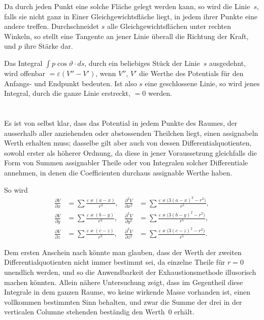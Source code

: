\documentclass[12pt,a4paper]{article}
\begin{document}
Da durch jeden Punkt eine solche Fläche gelegt werden kann, so wird die Linie~$s$,
falls sie nicht ganz in Einer Gleichgewichtsfläche liegt, in jedem ihrer Punkte eine
andere treffen. Durchschneidet $s$ alle Gleichgewichtsflächen unter rechten Winkeln,
so stellt eine Tangente an jener Linie überall die Richtung der Kraft, und $p$
ihre Stärke dar.

Das Integral $\int p\cos\vartheta\cdot ds$, durch ein beliebiges Stück der Linie~$s$ ausgedehnt,
wird offenbar $= \varepsilon(V''-V')$, wenn $V''$, $V'$ die Werthe des Potentials
für den Anfangs- und Endpunkt bedeuten. Ist also $s$ eine geschlossene Linie,
so wird jenes Integral, durch die ganze Linie erstreckt, $=0$ werden.

\section{}
Es ist von selbst klar, dass das Potential in jedem Punkte des Raumes, der
ausserhalb aller anziehenden oder abstossenden Theilchen liegt, einen assignabeln
Werth erhalten muss; dasselbe gilt aber auch von dessen Differentialquotienten,
sowohl erster als höherer Ordnung, da diese in jener Voraussetzung gleichfalls
die Form von Summen assignabler Theile oder von Integralen solcher Differentiale
annehmen, in denen die Coefficienten durchaus assignable Werthe haben.

So wird
\begin{align*}
\frac{\partial V}{\partial x} &= \sum\frac{\varepsilon\varkappa(a-x)}{r^3}, &
\frac{\partial^2 V}{\partial x^2} &= \sum\frac{\varepsilon\varkappa\bigl(3(a-x)^2-r^2\bigr)}{r^5},\\
\frac{\partial V}{\partial y} &= \sum\frac{\varepsilon\varkappa(b-y)}{r^3}, &
\frac{\partial^2 V}{\partial y^2} &= \sum\frac{\varepsilon\varkappa\bigl(3(b-y)^2-r^2\bigr)}{r^5},\\
\frac{\partial V}{\partial z} &= \sum\frac{\varepsilon\varkappa(c-z)}{r^3}, &
\frac{\partial^2 V}{\partial z^2} &= \sum\frac{\varepsilon\varkappa\bigl(3(c-z)^2-r^2\bigr)}{r^5}.
\end{align*}

Dem ersten Anschein nach könnte man glauben, dass der Werth der zweiten
Differentialquotienten nicht immer bestimmt sei, da einzelne Theile für $r=0$
unendlich werden, und so die Anwendbarkeit der Exhaustionsmethode illusorisch
machen könnten. Allein nähere Untersuchung zeigt, dass im Gegentheil diese
Integrale in dem ganzen Raume, wo keine wirkende Masse vorhanden ist,
einen vollkommen bestimmten Sinn behalten, und zwar die Summe der drei
in der verticalen Columne stehenden beständig den Werth~$0$ erhält.
\end{document}

